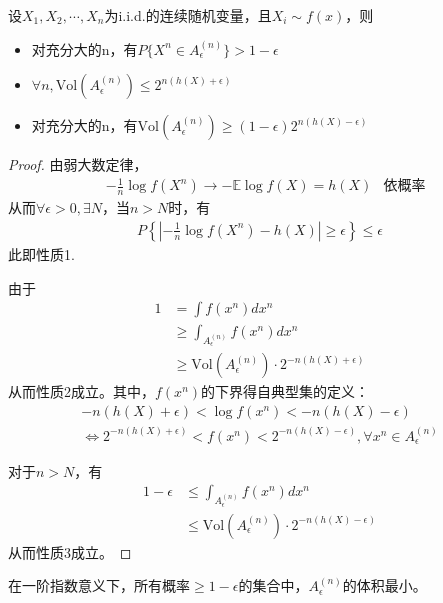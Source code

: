 \documentclass{ctexbook}
\begin{document}
\begin{theorem}[连续版本的AEP]
    设$X_1,X_2,\cdots,X_n$为i.i.d.的连续随机变量，且$X_i\sim f(x)$，则\begin{itemize}
        \item 对充分大的n，有$P\{X^n\in A^{(n)}_{\epsilon}\}>1-\epsilon$
        \item $\forall n,\text{Vol}(A^{(n)}_{\epsilon})\leq 2^{n(h(X)+\epsilon)}$
        \item 对充分大的n，有$\text{Vol}(A^{(n)}_{\epsilon})\geq (1-\epsilon)2^{n(h(X)-\epsilon)}$
    \end{itemize}
\end{theorem}
\begin{proof}
    由弱大数定律，\begin{align*}
        &-\frac{1}{n}\log f(X^n)\to -\mathbb{E} \log f(X)=h(X)&\text{依概率}
    \end{align*}
    从而$\forall \epsilon>0,\exists N$，当$n>N$时，有\begin{align*}
        P\left\{\left|-\frac{1}{n}\log f(X^n)-h(X)\right|\geq \epsilon\right\}\leq\epsilon
    \end{align*}
    此即性质1.

    由于\begin{align*}
        1&=\int f(x^n)dx^n\\
        &\geq \int_{A^{(n)}_{\epsilon}}f(x^n)dx^n\\
        &\geq \text{Vol}(A^{(n)}_{\epsilon})\cdot 2^{-n(h(X)+\epsilon)}
    \end{align*}
    从而性质2成立。其中，$f(x^n)$的下界得自典型集的定义：\begin{align*}
        -n(h(X)+\epsilon)<\log f(x^n)<-n(h(X)-\epsilon)\\
        \iff 2^{-n(h(X)+\epsilon)}<f(x^n)<2^{-n(h(X)-\epsilon)},\forall x^n\in A^{(n)}_{\epsilon}
    \end{align*}

    对于$n>N$，有\begin{align*}
        1-\epsilon&\leq \int_{A^{(n)}_{\epsilon}}f(x^n)dx^n\\
        &\leq \text{Vol}(A^{(n)}_{\epsilon})\cdot 2^{-n(h(X)-\epsilon)}
    \end{align*}
    从而性质3成立。
\end{proof}

\begin{theorem}
    在一阶指数意义下，所有概率$\geq 1-\epsilon$的集合中，$A^{(n)}_{\epsilon}$的体积最小。
\end{theorem}
\end{document}
